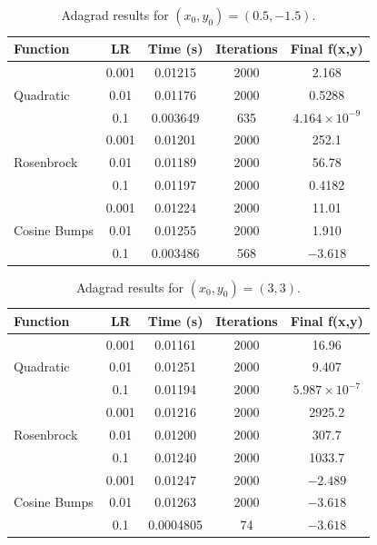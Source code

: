 \documentclass[conference]{IEEEtran}
\begin{document}
\begin{table}[H]
    \centering
    \caption{Adagrad results for $(x_0,y_0) = (0.5,-1.5)$.}
    \label{tab:adagrad_-05_-15}
    \begin{tabular}{lcccc}
        \hline
        \textbf{Function} & \textbf{LR} & \textbf{Time (s)} &
        \textbf{Iterations} & \textbf{Final f(x,y)} \\
        \hline

        \multirow{3}{*}{Quadratic}
        & 0.001 & 0.01215 & 2000 & 2.168 \\
        & 0.01  & 0.01176 & 2000 & 0.5288 \\
        & 0.1   & 0.003649 & 635 & $4.164\times10^{-9}$ \\
        \hline

        \multirow{3}{*}{Rosenbrock}
        & 0.001 & 0.01201 & 2000 & 252.1 \\
        & 0.01  & 0.01189 & 2000 & 56.78 \\
        & 0.1   & 0.01197 & 2000 & 0.4182 \\
        \hline

        \multirow{3}{*}{Cosine Bumps}
        & 0.001 & 0.01224 & 2000 & 11.01 \\
        & 0.01  & 0.01255 & 2000 & 1.910 \\
        & 0.1   & 0.003486 & 568 & $-3.618$ \\
        \hline

    \end{tabular}
\end{table}

\begin{table}[H]
    \centering
    \caption{Adagrad results for $(x_0,y_0) = (3, 3)$.}
    \label{tab:adagrad_3_3}
    \begin{tabular}{lcccc}
        \hline
        \textbf{Function} & \textbf{LR} & \textbf{Time (s)} &
        \textbf{Iterations} & \textbf{Final f(x,y)} \\
        \hline

        \multirow{3}{*}{Quadratic}
        & 0.001 & 0.01161 & 2000 & 16.96 \\
        & 0.01  & 0.01251 & 2000 & 9.407 \\
        & 0.1   & 0.01194 & 2000 & $5.987\times10^{-7}$ \\
        \hline

        \multirow{3}{*}{Rosenbrock}
        & 0.001 & 0.01216 & 2000 & 2925.2 \\
        & 0.01  & 0.01200 & 2000 & 307.7 \\
        & 0.1   & 0.01240 & 2000 & 1033.7 \\
        \hline

        \multirow{3}{*}{Cosine Bumps}
        & 0.001 & 0.01247 & 2000 & $-2.489$ \\
        & 0.01  & 0.01263 & 2000 & $-3.618$ \\
        & 0.1   & 0.0004805 & 74 & $-3.618$ \\
        \hline

    \end{tabular}
\end{table}
\end{document}
